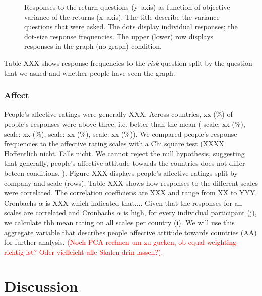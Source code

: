 \documentclass[a4paper,man, natbib,floatsintext]{apa6} %
\begin{document}
\begin{figure}[!htbp] 
  \centering
  \caption{Responses to the return questions (y--axis) as function of objective variance of the returns (x--axis). The title describe the variance questions that were asked. The dots display individual responses; the dot-size response frequencies. The upper (lower) row displays responses in the graph (no graph) condition. }
  \label{fig:retsvoS2}
\end{figure}


Table XXX shows response frequencies to the \textit{risk} question split by the question that we asked and whether people have seen the graph. 



\subsubsection{Affect}
People's affective ratings were generally XXX. Across countries, xx (\%) of people's responses were above three, i.e. better than the mean ( scale: xx (\%),  scale: xx (\%),  scale: xx (\%),  scale: xx (\%)). We compared people's response frequencies to the affective rating scales with a Chi square test (XXXX Hoffentlich nicht. Falls nicht. We cannot reject the null hypothesis, suggesting that generally, people's affective attitude towards the countries does not differ beteen conditions. ).
Figure XXX displays people's affective ratings split by company and scale (rows). Table XXX shows how responses to the different scales were correlated. The correlation coefficiens are XXX and range from XX to YYY. Cronbachs $\alpha$ is XXX which indicated that.... Given that the responses for all scales are correlated and Cronbachs $\alpha$ is high, for every individual participant (j), we calculate thh mean rating on all scales per country (i). We will use this aggregate variable that describes people affective attitude towards countries (AA) for further analysis. \textcolor{red}{(Noch PCA rechnen um zu gucken, ob equal weighting richtig ist? Oder vielleicht alle Skalen drin lassen?).}


\section{Discussion}


\end{document}

